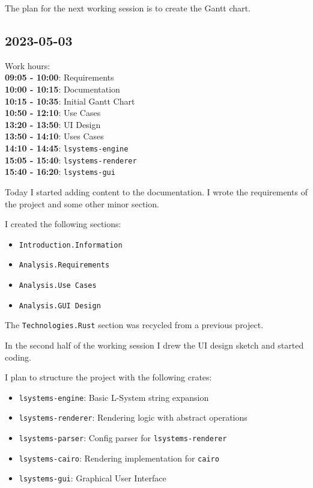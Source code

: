 \documentclass{article}
\begin{document}
The plan for the next working session is to create the Gantt chart.

\subsection{2023-05-03}

Work hours:\\
\textbf{09:05 - 10:00}: Requirements \\
\textbf{10:00 - 10:15}: Documentation \\
\textbf{10:15 - 10:35}: Initial Gantt Chart \\
\textbf{10:50 - 12:10}: Use Cases \\
\textbf{13:20 - 13:50}: UI Design \\
\textbf{13:50 - 14:10}: Uses Cases \\
\textbf{14:10 - 14:45}: \texttt{lsystems-engine} \\
\textbf{15:05 - 15:40}: \texttt{lsystems-renderer} \\
\textbf{15:40 - 16:20}: \texttt{lsystems-gui}

Today I started adding content to the documentation.
I wrote the requirements of the project and some other minor section.

I created the following sections:
\begin{itemize}
    \item \texttt{Introduction.Information}
    \item \texttt{Analysis.Requirements}
    \item \texttt{Analysis.Use Cases}
    \item \texttt{Analysis.GUI Design}
\end{itemize}

The \texttt{Technologies.Rust} section was recycled from a previous
project.

In the second half of the working session I drew the UI design sketch
and started coding.

I plan to structure the project with the following crates:
\begin{itemize}
    \item \texttt{lsystems-engine}: Basic L-System string expansion
    \item \texttt{lsystems-renderer}: Rendering logic with abstract operations
    \item \texttt{lsystems-parser}: Config parser for \texttt{lsystems-renderer}
    \item \texttt{lsystems-cairo}: Rendering implementation for \texttt{cairo}
    \item \texttt{lsystems-gui}: Graphical User Interface
\end{itemize}
\end{document}
